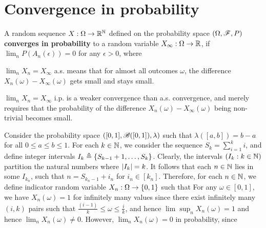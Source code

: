 \documentclass[letterpaper,10pt,english]{article}
\begin{document}
\section{Convergence in probability}
\begin{defn} 
A random sequence $X:\Omega\to\mathbb{R}^{\mathbb{N}}$ defined on the probability space $(\Omega, \mathscr{F}, P)$ \textbf{converges in probability} to a random variable $X_\infty:\Omega\to\mathbb{R}$, 
if $\lim_nP(A_n(\epsilon)) = 0$ for any $\epsilon > 0$, 
where 
\end{defn}
\begin{rem} 
$\lim_nX_n = X_\infty$ a.s. means that for almost all outcomes $\omega$, 
the difference $X_n(\omega)-X_\infty(\omega)$ gets small and stays small. 
\end{rem}
\begin{rem}
$\lim_nX_n = X_\infty$ i.p. is a weaker convergence than a.s. convergence, 
and merely requires that the probability of the difference $X_n(\omega)-X_\infty(\omega)$ being non-trivial becomes small. 
\end{rem}
\begin{shaded}
\begin{exmp} 
Consider the probability space $([0,1], \mathscr{B}([0,1]), \lambda)$ such that $\lambda([a,b]) = b-a$ for all $0 \le a \le b \le 1$. 
For each $k \in \mathbb{N}$, we consider the sequence $S_k = \sum_{i=1}^ki$, and define integer intervals $I_k \triangleq \left\{S_{k-1}+1, \dots, S_k\right\}$. 
Clearly, the intervals $(I_k:k \in \mathbb{N})$ partition the natural numbers where $\left\lvert I_k\right\rvert = k$. 
It follows that each $n \in \mathbb{N}$ lies in some $I_{k_n}$, such that $n = S_{k_n-1}+i_n$ for $i_n \in [k_n]$. 
Therefore, for each $n \in \mathbb{N}$, we define indicator random variable $X_n: \Omega \to \left\{0,1\right\}$ such that 
For any $\omega \in [0,1]$, we have $X_n(\omega) = 1$ for infinitely many values since there exist infinitely many $(i,k)$ pairs such that $\frac{(i-1)}{k} \le \omega \le \frac{i}{k}$, 
and hence $\lim\sup_nX_n(\omega) = 1$ and hence $\lim_nX_n(\omega) \neq 0$. 
However, $\lim_nX_n(\omega) = 0$ in probability, since 
\end{exmp}
\end{shaded}
\end{document}

